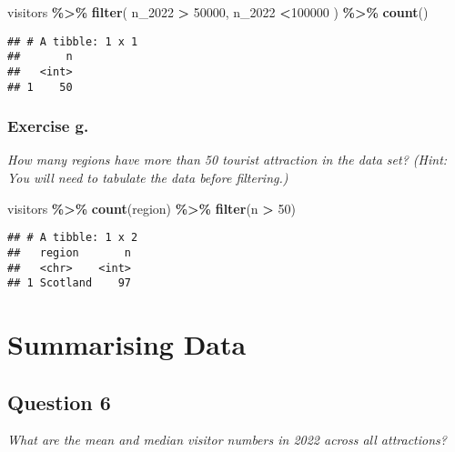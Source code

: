 \documentclass[
]{article}
\newenvironment{Shaded}{\begin{snugshade}}{\end{snugshade}}
\newcommand{\DecValTok}[1]{\textcolor[rgb]{0.00,0.00,0.81}{#1}}
\newcommand{\FunctionTok}[1]{\textcolor[rgb]{0.13,0.29,0.53}{\textbf{#1}}}
\newcommand{\NormalTok}[1]{#1}
\newcommand{\SpecialCharTok}[1]{\textcolor[rgb]{0.81,0.36,0.00}{\textbf{#1}}}
\begin{document}
\begin{Shaded}
\begin{Highlighting}[]
\NormalTok{visitors }\SpecialCharTok{\%\textgreater{}\%} 
  \FunctionTok{filter}\NormalTok{(}
\NormalTok{    n\_2022 }\SpecialCharTok{\textgreater{}} \DecValTok{50000}\NormalTok{,}
\NormalTok{    n\_2022 }\SpecialCharTok{\textless{}}\DecValTok{100000}\NormalTok{ ) }\SpecialCharTok{\%\textgreater{}\%}
  \FunctionTok{count}\NormalTok{()}
\end{Highlighting}
\end{Shaded}

\begin{verbatim}
## # A tibble: 1 x 1
##       n
##   <int>
## 1    50
\end{verbatim}

\subsubsection{Exercise g.}\label{exercise-g.}

\emph{How many regions have more than 50 tourist attraction in the data
set? (Hint: You will need to tabulate the data before filtering.)}

\begin{Shaded}
\begin{Highlighting}[]
\NormalTok{visitors }\SpecialCharTok{\%\textgreater{}\%} 
  \FunctionTok{count}\NormalTok{(region) }\SpecialCharTok{\%\textgreater{}\%}
  \FunctionTok{filter}\NormalTok{(n }\SpecialCharTok{\textgreater{}} \DecValTok{50}\NormalTok{)}
\end{Highlighting}
\end{Shaded}

\begin{verbatim}
## # A tibble: 1 x 2
##   region       n
##   <chr>    <int>
## 1 Scotland    97
\end{verbatim}

\section{Summarising Data}\label{summarising-data}

\subsection{Question 6}\label{question-6}

\emph{What are the mean and median visitor numbers in 2022 across all
attractions?}
\end{document}
